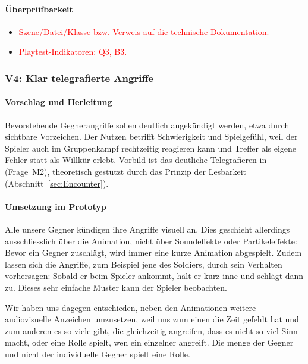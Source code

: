 \documentclass[../Main.tex]{subfiles}
\begin{document}
\paragraph{Überprüfbarkeit}
\begin{itemize}[leftmargin=1.5cm]
    \item \textcolor{red}{Szene/Datei/Klasse bzw. Verweis auf die technische Dokumentation.}
    \item \textcolor{red}{Playtest-Indikatoren: Q3, B3.}
\end{itemize}

\subsubsection{V4: Klar telegrafierte Angriffe} \label{sec:V4}

\paragraph{Vorschlag und Herleitung}
Bevorstehende Gegnerangriffe sollen deutlich angekündigt werden, etwa durch sichtbare Vorzeichen. Der Nutzen betrifft Schwierigkeit und Spielgefühl, weil der Spieler auch im Gruppenkampf rechtzeitig reagieren kann und Treffer als eigene Fehler statt als Willkür erlebt. Vorbild ist das deutliche Telegrafieren in  (Frage~M2), theoretisch gestützt durch das Prinzip der Lesbarkeit (Abschnitt~\ref{sec:Encounter}).

\paragraph{Umsetzung im Prototyp}
Alle unsere Gegner kündigen ihre Angriffe visuell an. Dies geschieht allerdings ausschliesslich über die Animation, nicht über Soundeffekte oder Partikeleffekte: Bevor ein Gegner zuschlägt, wird immer eine kurze Animation abgespielt. Zudem lassen sich die Angriffe, zum Beispiel jene des Soldiers, durch sein Verhalten vorhersagen: Sobald er beim Spieler ankommt, hält er kurz inne und schlägt dann zu. Dieses sehr einfache Muster kann der Spieler beobachten.

Wir haben uns dagegen entschieden, neben den Animationen weitere audiovisuelle Anzeichen umzusetzen, weil uns zum einen die Zeit gefehlt hat und zum anderen es so viele gibt, die gleichzeitig angreifen, dass es nicht so viel Sinn macht, oder eine Rolle spielt, wen ein einzelner angreift. Die menge der Gegner und nicht der individuelle Gegner spielt eine Rolle.
\end{document}
